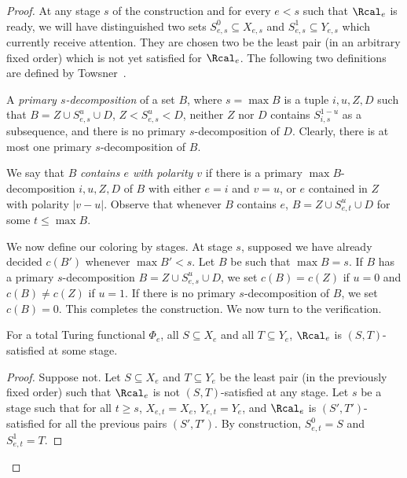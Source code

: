 \begin{proof}
At any stage $s$ of the construction and for every $e < s$ such that $\Rcal_e$ is ready, we will have distinguished two sets $S^0_{e,s} \subseteq X_{e,s}$ and $S^1_{e,s} \subseteq Y_{e,s}$ which currently receive attention. They are chosen two be the least pair (in an arbitrary fixed order) which is not yet satisfied for $\Rcal_e$. The following two definitions are defined by Towsner~\cite[Theorem 3.8]{Towsner2012simple}.

A \emph{primary $s$-decomposition} of a set $B$, where $s = \max B$ is a tuple $i, u, Z, D$ such that $B = Z \cup S^u_{e,s} \cup D$, $Z < S^u_{e,s} < D$,
neither $Z$ nor $D$ contains $S^{1-u}_{i,s}$ as a subsequence, and there is no primary $s$-decomposition of $D$. Clearly, there is at most one primary $s$-decomposition of $B$.

We say that $B$ \emph{contains $e$ with polarity $v$} if there is a primary $\max B$-decomposition $i, u, Z, D$ of $B$ with either $e = i$ and $v = u$,
or $e$ contained in $Z$ with polarity $|v-u|$. Observe that whenever $B$ contains $e$, $B = Z \cup S^u_{e,t} \cup D$ for some $t \leq \max B$.

We now define our coloring by stages. At stage $s$, supposed we have already decided $c(B')$ whenever $\max B' < s$. Let $B$ be such that $\max B = s$. If $B$ has a primary $s$-decomposition $B = Z \cup S^u_{e,s} \cup D$, we set $c(B) = c(Z)$ if $u = 0$ and $c(B) \neq c(Z)$ if $u = 1$. If there is no primary $s$-decomposition of $B$, we set $c(B) = 0$. This completes the construction. We now turn to the verification.


\begin{claim}
For a total Turing functional $\Phi_e$, all $S \subseteq X_e$ and all $T \subseteq Y_e$, $\Rcal_e$ is $(S,T)$-satisfied at some stage. 
\end{claim}
\begin{proof}
Suppose not. Let $S \subseteq X_e$ and $T \subseteq Y_e$ be the least pair (in the previously fixed order) such that $\Rcal_e$ is not $(S,T)$-satisfied at any stage. Let $s$ be a stage such that for all $t \geq s$, $X_{e,t} = X_e$, $Y_{e,t} = Y_e$, and $\Rcal_e$ is $(S',T')$-satisfied for all the previous pairs $(S', T')$. By construction, $S^0_{e,t} = S$ and $S^1_{e,t} = T$.


\end{proof}
\end{proof}
